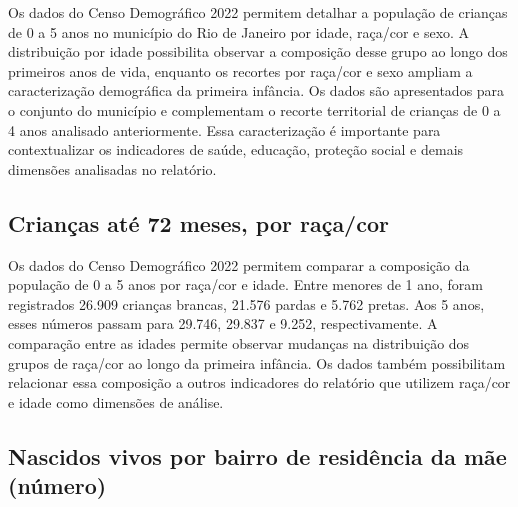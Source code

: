 Os dados do Censo Demográfico 2022 permitem detalhar a população de crianças de 0 a 5 anos no município do Rio de Janeiro por idade, raça/cor e sexo. A distribuição por idade possibilita observar a composição desse grupo ao longo dos primeiros anos de vida, enquanto os recortes por raça/cor e sexo ampliam a caracterização demográfica da primeira infância. Os dados são apresentados para o conjunto do município e complementam o recorte territorial de crianças de 0 a 4 anos analisado anteriormente. Essa caracterização é importante para contextualizar os indicadores de saúde, educação, proteção social e demais dimensões analisadas no relatório.


\subsection{Crianças até 72 meses, por raça/\allowbreak{}cor}


Os dados do Censo Demográfico 2022 permitem comparar a composição da população de 0 a 5 anos por raça/cor e idade. Entre menores de 1 ano, foram registrados 26.909 crianças brancas, 21.576 pardas e 5.762 pretas. Aos 5 anos, esses números passam para 29.746, 29.837 e 9.252, respectivamente. A comparação entre as idades permite observar mudanças na distribuição dos grupos de raça/cor ao longo da primeira infância. Os dados também possibilitam relacionar essa composição a outros indicadores do relatório que utilizem raça/cor e idade como dimensões de análise.


\subsection{Nascidos vivos por bairro de residência da mãe (número)}


